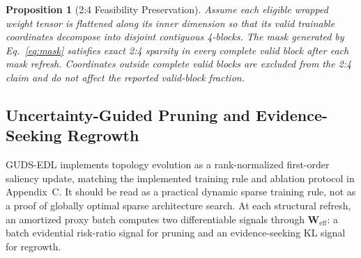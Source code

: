 \documentclass[letterpaper]{article} %
\newtheorem{proposition}{Proposition}
\begin{document}
\begin{proposition}[2:4 Feasibility Preservation]
\label{prop:24_feasibility}
Assume each eligible wrapped weight tensor is flattened along its inner dimension so that its valid trainable coordinates decompose into disjoint contiguous 4-blocks. The mask generated by Eq.~\ref{eq:mask} satisfies exact 2:4 sparsity in every complete valid block after each mask refresh. Coordinates outside complete valid blocks are excluded from the 2:4 claim and do not affect the reported valid-block fraction.
\end{proposition}

\subsection{Uncertainty-Guided Pruning and Evidence-Seeking Regrowth}
GUDS-EDL implements topology evolution as a rank-normalized first-order saliency update, matching the implemented training rule and ablation protocol in Appendix~C. It should be read as a practical dynamic sparse training rule, not as a proof of globally optimal sparse architecture search. At each structural refresh, an amortized proxy batch computes two differentiable signals through $\bm{W}_{\text{eff}}$: a batch evidential risk-ratio signal for pruning and an evidence-seeking KL signal for regrowth.
\end{document}
